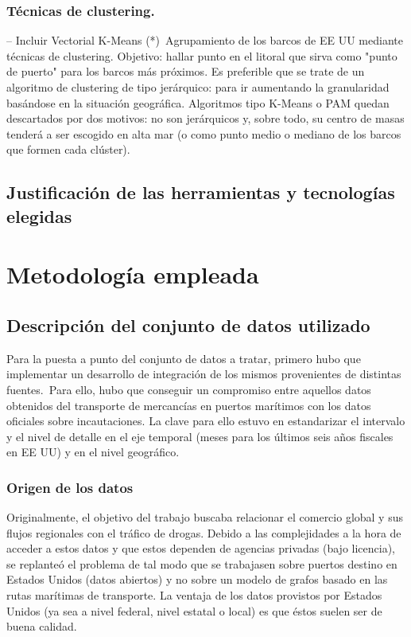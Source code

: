 \documentclass{article}
\begin{document}
		\subsubsection{Técnicas de clustering.}
		-- Incluir Vectorial K-Means (*)\
		Agrupamiento de los barcos de EE UU mediante técnicas de clustering. Objetivo: hallar punto en el litoral que sirva como "punto de puerto" para los barcos más próximos. Es preferible que se trate de un algoritmo de clustering de tipo jerárquico: para ir aumentando la granularidad basándose en la situación geográfica.
		Algoritmos tipo K-Means o PAM quedan descartados por dos motivos: no son jerárquicos y, sobre todo, su centro de masas tenderá a ser escogido en alta mar (o como punto medio o mediano de los barcos que formen cada clúster).\
		
	\subsection{Justificación de las herramientas y tecnologías elegidas}
	
	
\section{Metodología empleada}	

	\subsection{Descripción del conjunto de datos utilizado}
	Para la puesta a punto del conjunto de datos a tratar, primero hubo que implementar un desarrollo de integración de los mismos provenientes de distintas fuentes.\
	Para ello, hubo que conseguir un compromiso entre aquellos datos obtenidos del transporte de mercancías en puertos marítimos con los datos oficiales sobre incautaciones. La clave para ello estuvo en estandarizar el intervalo y el nivel de detalle en el eje temporal (meses para los últimos seis años fiscales en EE UU) y en el nivel geográfico.\
	
		\subsubsection{Origen de los datos}
		Originalmente, el objetivo del trabajo buscaba relacionar el comercio global y sus flujos regionales con el tráfico de drogas. Debido a las complejidades a la hora de acceder a estos datos y que estos dependen de agencias privadas (bajo licencia), se replanteó el problema de tal modo que se trabajasen sobre puertos destino en Estados Unidos (datos abiertos) y no sobre un modelo de grafos basado en las rutas marítimas de transporte. La ventaja de los datos provistos por Estados Unidos (ya sea a nivel federal, nivel estatal o local) es que éstos suelen ser de buena calidad.\
		
\end{document}
